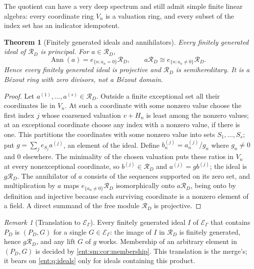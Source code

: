 \documentclass[11pt]{article}
\newtheorem{theorem}{Theorem}[section]
\theoremstyle{plain}
\theoremstyle{plain}
\theoremstyle{plain}
\theoremstyle{definition}
\theoremstyle{definition}
\theoremstyle{definition}
\theoremstyle{definition}
\theoremstyle{remark}
\newtheorem{remark}[remark]{Remark}
\newcommand{\RD}{\mathcal R_D}\newcommand{\Ucal}{\mathcal U}
\begin{document}
The quotient can have a very deep spectrum and still admit simple finite
linear algebra: every coordinate ring $V_n$ is a valuation ring, and every
subset of the index set has an indicator idempotent.

\begin{theorem}[Finitely generated ideals and annihilators]
\label{ent:ps:thm:bezout}
Every finitely generated ideal of $\RD$ is principal. For $a\in\RD$,
\[
 \operatorname{Ann}(a)=e_{\{n:a_n=0\}}\RD,\qquad
 a\RD\cong e_{\{n:a_n\ne0\}}\RD .
\]
Hence every finitely generated ideal is projective and $\RD$ is
semihereditary. It is a B\'ezout ring with zero divisors, not a B\'ezout
domain.
\end{theorem}
\begin{proof}
Let $a^{(1)},\ldots,a^{(s)}\in\RD$. Outside a finite exceptional set all their
coordinates lie in $V_n$. At such a coordinate with some nonzero value choose
the first index $j$ whose coarsened valuation $v+H_n$ is least among the
nonzero values; at an exceptional coordinate choose any index with a nonzero
value, if there is one. This partitions the coordinates with some nonzero
value into sets $S_1,\ldots,S_s$; put $g=\sum_je_{S_j}a^{(j)}$, an element of
the ideal. Define $b^{(j)}_n=a^{(j)}_n/g_n$ where $g_n\ne0$ and $0$ elsewhere.
The minimality of the chosen valuation puts these ratios in $V_n$ at every
nonexceptional coordinate, so $b^{(j)}\in\RD$ and $a^{(j)}=gb^{(j)}$; the
ideal is $g\RD$. The annihilator of $a$ consists of the sequences supported
on its zero set, and multiplication by $a$ maps $e_{\{a_n\ne0\}}\RD$
isomorphically onto $a\RD$, being onto by definition and injective because
each surviving coordinate is a nonzero element of a field. A direct summand
of the free module $\RD$ is projective.
\end{proof}

\begin{remark}[Translation to $\mathcal E_\Gamma$]\label{ent:ps:rem:fg-ideals}
Every finitely generated ideal $I$ of $\mathcal E_\Gamma$ that contains
$P_D$ is $(P_D,G)$ for a single $G\in\mathcal E_\Gamma$: the image of $I$ in
$\RD$ is finitely generated, hence $g\RD$, and any lift $G$ of $g$ works.
Membership of an arbitrary element in $(P_D,G)$ is decided by
\cref{ent:sm:cor:membership}. This translation is the merge's; it bears on
\cref{ent:q:ideals} only for ideals containing this product.
\end{remark}
\end{document}
